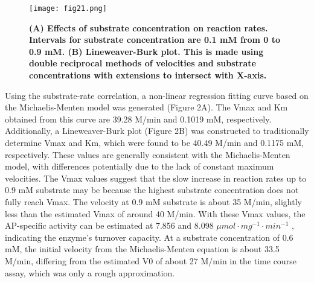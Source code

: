 \documentclass[a4paper,10pt]{article}
\begin{document}
\begin{multicols}{2}
\begin{figure}[H]
\centering
\texttt{[image: fig21.png]}
\caption{\scriptsize \textbf{(A) Effects of substrate concentration on reaction rates. Intervals for substrate concentration are 0.1 mM from 0 to 0.9 mM. (B) Lineweaver-Burk plot. This is made using double reciprocal methods of velocities and substrate concentrations with extensions to intersect with X-axis.}}
\label{fig3}
\end{figure}


Using the substrate-rate correlation, a non-linear regression fitting curve based on the Michaelis-Menten model was generated (Figure 2A). The Vmax and Km obtained from this curve are 39.28 \textmu M/min and 0.1019 mM, respectively. Additionally, a Lineweaver-Burk plot (Figure 2B) was constructed to traditionally determine Vmax and Km, which were found to be 40.49 \textmu M/min and 0.1175 mM, respectively. These values are generally consistent with the Michaelis-Menten model, with differences potentially due to the lack of constant maximum velocities. The Vmax values suggest that the slow increase in reaction rates up to 0.9 mM substrate may be because the highest substrate concentration does not fully reach Vmax. The velocity at 0.9 mM substrate is about 35 \textmu M/min, slightly less than the estimated Vmax of around 40 \textmu M/min. With these Vmax values, the AP-specific activity can be estimated at 7.856 and 8.098 $\mu mol\cdot mg^{-1}\cdot min^{-1}$ , indicating the enzyme's turnover capacity. At a substrate concentration of 0.6 mM, the initial velocity from the Michaelis-Menten equation is about 33.5 \textmu M/min, differing from the estimated V0 of about 27 \textmu M/min in the time course assay, which was only a rough approximation.




\end{multicols}
\end{document}
